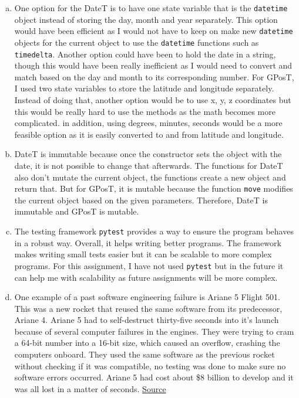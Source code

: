 \documentclass[12pt]{article}
\begin{document}
\begin{enumerate}[(a)]

\item One option for the DateT is to have one state variable that is the \texttt{datetime} object instead of storing the day, month and year separately. This option would have been efficient as I would not have to keep on make new \texttt{datetime} objects for the current object to use the \texttt{datetime} functions such as \texttt{timedelta}. Another option could have been to hold the date in a string, though this would have been really inefficient as I would need to convert and match based on the day and month to its corresponding number. For GPosT, I used two state variables to store the latitude and longitude separately. Instead of doing that, another option would be to use x, y, z coordinates but this would be really hard to use the methods as the math becomes more complicated. in addition, using degrees, minutes, seconds would be a more feasible option as it is easily converted to and from latitude and longitude.

\item DateT is immutable because once the constructor sets the object with the date, it is not possible to change that afterwards. The functions for DateT also don't mutate the current object, the functions create a new object and return that. But for GPosT, it is mutable because the function \texttt{move} modifies the current object based on the given parameters. Therefore, DateT is immutable and GPosT is mutable.

\item The testing framework \texttt{pytest} provides a way to ensure the program behaves in a robust way. Overall, it helps writing better programs. The framework makes writing small tests easier but it can be scalable to more complex programs. For this assignment, I have not used \texttt{pytest} but in the future it can help me with scalability as future assignments will be more complex.

\item One example of a past software engineering failure is Ariane 5 Flight 501. This was a new rocket that reused the same software from its predecessor, Ariane 4. Ariane 5 had to self-destruct thirty-five seconds into it's launch because of several computer failures in the engines. They were trying to cram a 64-bit number into a 16-bit size, which caused an overflow, crashing the computers onboard. They used the same software as the previous rocket without checking if it was compatible, no testing was done to make sure no software errors occurred. Ariane 5 had cost about \$8 billion to develop and it was all lost in a matter of seconds. \href{https://raygun.com/blog/costly-software-errors-history}{Source}


\end{enumerate}
\end{document}
